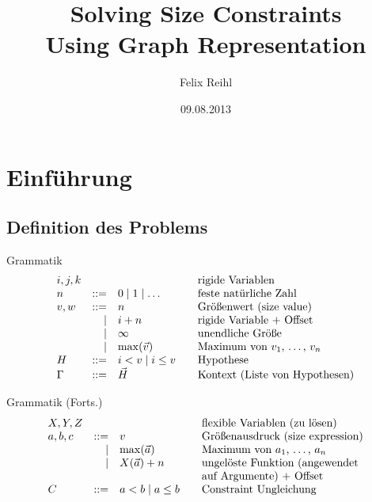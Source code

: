 \documentclass[hyperref={pdfpagelabels=false}]{beamer}
\title{Solving Size Constraints \\Using Graph Representation}
\author{Felix Reihl}
\date{09.08.2013}
\begin{document}
\begin{frame}
	\titlepage
\end{frame} 

\begin{frame}
	\tableofcontents
\end{frame} 

\section{Einführung}
\subsection{Definition des Problems}
\begin{frame}
	\begin{block}{Grammatik}
		\small
		\[
			\begin{array}{lrl@{\qquad}l}
				i,j,k &&& \mbox{rigide Variablen} \\
				n     & ::=  & 0 \mid 1 \mid \dots & \mbox{feste natürliche Zahl}
				\\
				v,w   & ::=  & n      & \mbox{Größenwert (size value)} \\
									& \mid & i + n  & \mbox{rigide Variable + Offset}  \\
								 & \mid & \infty & \mbox{unendliche Größe}  \\
								& \mid & \max(\vec v) & \mbox{Maximum von $v_1$, \dots, $v_n$} \\ 
				H     & ::= & i < v \mid i \leq v & \mbox{Hypothese} \\
				\Gamma& ::= & \vec H & \mbox{Kontext (Liste von Hypothesen)} \\
			\end{array}
		\]
	\end{block}
\end{frame}
\begin{frame}
	\begin{block}{Grammatik (Forts.)}
		\small
		\[
			\begin{array}{lrl@{\qquad}l}
				X,Y,Z &&& \mbox{flexible Variablen (zu lösen)} \\
				a,b,c & ::=  & v             &  \mbox{Größenausdruck (size expression)} \\
									& \mid & \max(\vec a) & \mbox{Maximum von $a_1$, \dots, $a_n$} \\ 
								 & \mid & X(\vec a) + n & \mbox{ungelöste Funktion (angewendet} \\
								 &&& \mbox{auf Argumente) + Offset} \\
				C     & ::= & a < b \mid a \leq b & \mbox{Constraint Ungleichung} \\
			\end{array}
		\]
	\end{block}
\end{frame}
\end{document}
